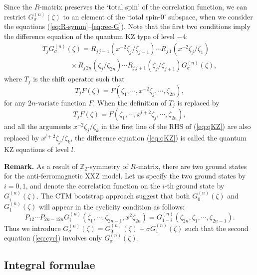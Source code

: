 \documentclass[a4paper,10pt]{article}
\begin{document}
Since the $R$-matrix preserves the `total spin' of 
the correlation function, we can restrict 
$G_{\sigma}^{(n)}(\zeta)$ to an element of the 
`total spin-$0$' subspace, when we consider the equations 
(\ref{eq:R-symm}--\ref{eq:rec-G}). Note that the first 
two conditions imply the difference equation of 
the quantum KZ type \cite{FR} of level $-4$: 
\begin{equation}
\begin{array}{l}
T_j G_{\sigma}^{(n)} (\zeta)
=
R_{j\,j-1}(x^{-2} \zeta_j/\zeta_{j-1})
\cdots
R_{j\,1}(x^{-2} \zeta_{j}/\zeta_1 ) \\
\qquad\qquad \times
R_{j\,2n}(\zeta_{j}/\zeta_{2n})
\cdots
R_{j\,j+1}(\zeta_{j}/\zeta_{j+1})
G_{\sigma}^{(n)} (\zeta), 
\label{eq:qKZ}
\end{array}
\end{equation}
where $T_j$ is the shift operator such that 
\begin{equation}
T_j F (\zeta)
=F (\zeta_1,\cdots,x^{-2}\zeta_j,\cdots,\zeta_{2n}), 
\label{eq:T-shift}
\end{equation}
for any $2n$-variate function $F$. When the definition 
of $T_j$ is replaced by 
$$
T_j F (\zeta)
=F (\zeta_1,\cdots,x^{l+2}\zeta_j,\cdots,\zeta_{2n}), 
$$
and all the arguments $x^{-2}\zeta_j /\zeta_k$ in the 
first line of the RHS of (\ref{eq:qKZ}) are also replaced 
by $x^{l+2}\zeta_j /\zeta_k$, the difference equation 
(\ref{eq:qKZ}) is called the quantum KZ equations of 
level $l$. 

{\bf Remark.} As a result of $\mathbb{Z}_2$-symmetry 
of $R$-matrix, there are two ground states for 
the anti-ferromagnetic XXZ model. Let us specify the 
two ground states by $i=0, 1$, and denote the correlation 
function on the $i$-th ground state by $G^{(n)}_i (\zeta)$. 
The CTM bootstrap approach suggest that both 
$G^{(n)}_0 (\zeta)$ and $G^{(n)}_1 (\zeta)$ will appear 
in the cyclicity condition as follows: 
$$
P_{12}\cdots P_{2n-1 2n} G_{i}^{(n)} 
(\zeta_1,\cdots,\zeta_{2n-1}, x^{2}\zeta_{2n})
=G_{1-i}^{(n)} 
(\zeta_{2n}, \zeta_1,\cdots,\zeta_{2n-1}). 
$$
Thus we introduce $G^{(n)}_\sigma(\zeta)
=G^{(n)}_0 (\zeta)+\sigma G^{(n)}_1 (\zeta)$ 
such that the second equation (\ref{eq:cyc}) 
involves only $G^{(n)}_\sigma (\zeta)$. 

\subsection{Integral formulae} 
\end{document}
